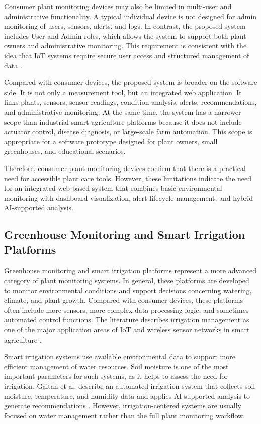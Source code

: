 Consumer plant monitoring devices may also be limited in multi-user and administrative functionality. A typical individual device is not designed for admin monitoring of users, sensors, alerts, and logs. In contrast, the proposed system includes User and Admin roles, which allows the system to support both plant owners and administrative monitoring. This requirement is consistent with the idea that IoT systems require secure user access and structured management of data \cite{huda2024iot}.

Compared with consumer devices, the proposed system is broader on the software side. It is not only a measurement tool, but an integrated web application. It links plants, sensors, sensor readings, condition analysis, alerts, recommendations, and administrative monitoring. At the same time, the system has a narrower scope than industrial smart agriculture platforms because it does not include actuator control, disease diagnosis, or large-scale farm automation. This scope is appropriate for a software prototype designed for plant owners, small greenhouses, and educational scenarios.

Therefore, consumer plant monitoring devices confirm that there is a practical need for accessible plant care tools. However, these limitations indicate the need for an integrated web-based system that combines basic environmental monitoring with dashboard visualization, alert lifecycle management, and hybrid AI-supported analysis.
\subsection{Greenhouse Monitoring and Smart Irrigation Platforms}

Greenhouse monitoring and smart irrigation platforms represent a more advanced category of plant monitoring systems. In general, these platforms are developed to monitor environmental conditions and support decisions concerning watering, climate, and plant growth. Compared with consumer devices, these platforms often include more sensors, more complex data processing logic, and sometimes automated control functions. The literature describes irrigation management as one of the major application areas of IoT and wireless sensor networks in smart agriculture \cite{mowla2023iot,hassan2021systematic}.

Smart irrigation systems use available environmental data to support more efficient management of water resources. Soil moisture is one of the most important parameters for such systems, as it helps to assess the need for irrigation. Gaitan et al. describe an automated irrigation system that collects soil moisture, temperature, and humidity data and applies AI-supported analysis to generate recommendations \cite{gaitan2025integrating}. However, irrigation-centered systems are usually focused on water management rather than the full plant monitoring workflow.

